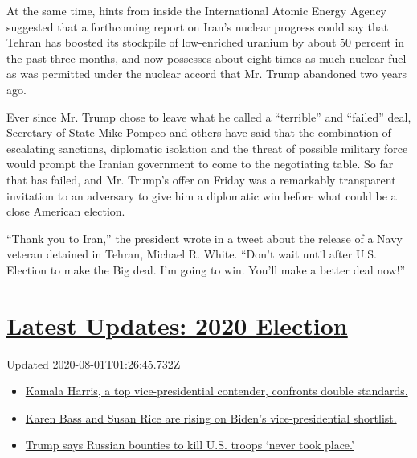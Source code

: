 At the same time, hints from inside the International Atomic Energy
Agency suggested that a forthcoming report on Iran's nuclear progress
could say that Tehran has boosted its stockpile of low-enriched uranium
by about 50 percent in the past three months, and now possesses about
eight times as much nuclear fuel as was permitted under the nuclear
accord that Mr. Trump abandoned two years ago.

Ever since Mr. Trump chose to leave what he called a ``terrible'' and
``failed'' deal, Secretary of State Mike Pompeo and others have said
that the combination of escalating sanctions, diplomatic isolation and
the threat of possible military force would prompt the Iranian
government to come to the negotiating table. So far that has failed, and
Mr. Trump's offer on Friday was a remarkably transparent invitation to
an adversary to give him a diplomatic win before what could be a close
American election.

``Thank you to Iran,'' the president wrote in a tweet about the release
of a Navy veteran detained in Tehran, Michael R. White. ``Don't wait
until after U.S. Election to make the Big deal. I'm going to win. You'll
make a better deal now!''

\hypertarget{latest-updates-2020-election}{%
\section{\texorpdfstring{\href{https://www.nytimes.com/2020/07/31/us/elections/biden-vs-trump.html?action=click\&pgtype=Article\&state=default\&region=MAIN_CONTENT_1\&context=storylines_live_updates}{Latest
Updates: 2020
Election}}{Latest Updates: 2020 Election}}\label{latest-updates-2020-election}}

Updated 2020-08-01T01:26:45.732Z

\begin{itemize}
\tightlist
\item
  \href{https://www.nytimes.com/2020/07/31/us/elections/biden-vs-trump.html?action=click\&pgtype=Article\&state=default\&region=MAIN_CONTENT_1\&context=storylines_live_updates\#link-29fdff45}{Kamala
  Harris, a top vice-presidential contender, confronts double
  standards.}
\item
  \href{https://www.nytimes.com/2020/07/31/us/elections/biden-vs-trump.html?action=click\&pgtype=Article\&state=default\&region=MAIN_CONTENT_1\&context=storylines_live_updates\#link-13ec3d9c}{Karen
  Bass and Susan Rice are rising on Biden's vice-presidential
  shortlist.}
\item
  \href{https://www.nytimes.com/2020/07/31/us/elections/biden-vs-trump.html?action=click\&pgtype=Article\&state=default\&region=MAIN_CONTENT_1\&context=storylines_live_updates\#link-49e9a016}{Trump
  says Russian bounties to kill U.S. troops `never took place.'}
\end{itemize}

